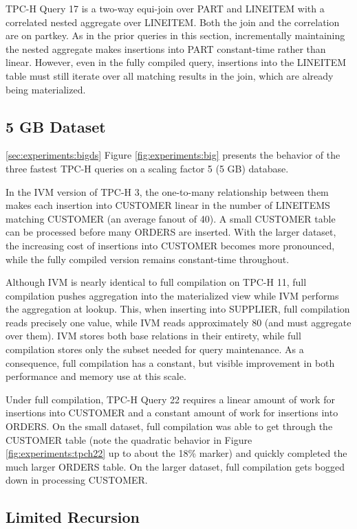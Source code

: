 TPC-H Query 17 is a two-way equi-join over PART and LINEITEM with a correlated nested aggregate over LINEITEM.  Both the join and the correlation are on partkey.  As in the prior queries in this section, incrementally maintaining the nested aggregate makes insertions into PART constant-time rather than linear.  However, even in the fully compiled query, insertions into the LINEITEM table must still iterate over all matching results in the join, which are already being materialized.  

\subsection{5 GB Dataset}
\ref{sec:experiments:bigds}
Figure \ref{fig:experiments:big} presents the behavior of the three fastest TPC-H queries on a scaling factor 5 (5 GB) database.

In the IVM version of TPC-H 3, the one-to-many relationship between them makes each insertion into CUSTOMER linear in the number of LINEITEMS matching CUSTOMER (an average fanout of 40).  A small CUSTOMER table can be processed before many ORDERS are inserted.  With the larger dataset, the increasing cost of insertions into CUSTOMER becomes more pronounced, while the fully compiled version remains constant-time throughout.

Although IVM is nearly identical to full compilation on TPC-H 11, full compilation pushes aggregation into the materialized view while IVM performs the aggregation at lookup.  This, when inserting into SUPPLIER, full compilation reads precisely one value, while IVM reads approximately 80 (and must aggregate over them).  IVM stores both base relations in their entirety, while full compilation stores only the subset needed for query maintenance.  As a consequence, full compilation has a constant, but visible improvement in both performance and memory use at this scale.

Under full compilation, TPC-H Query 22 requires a linear amount of work for insertions into CUSTOMER and a constant amount of work for insertions into ORDERS.  On the small dataset, full compilation was able to get through the CUSTOMER table (note the quadratic behavior in Figure \ref{fig:experiments:tpch22} up to about the 18\% marker) and quickly completed the much larger ORDERS table.  On the larger dataset, full compilation gets bogged down in processing CUSTOMER.

\subsection{Limited Recursion}
\label{sec:experiments:othermetrics}

